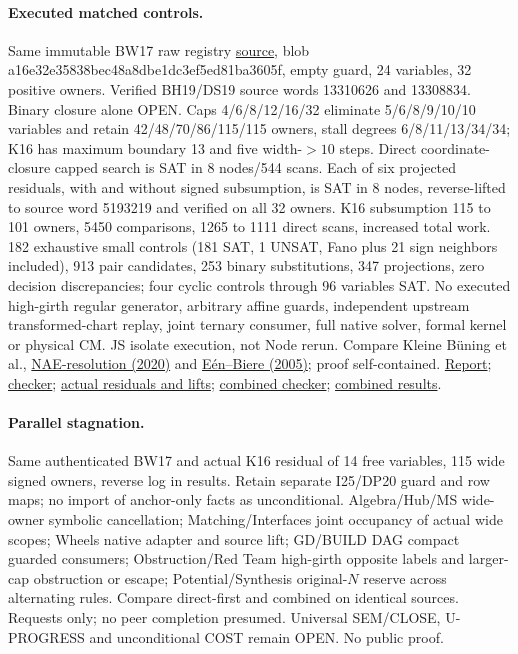 \documentclass[11pt]{article}
\begin{document}
\paragraph{Executed matched controls.}
Same immutable BW17 raw registry \href{https://github.com/j15marti/pnp/commit/9164cb11c6fcdf96d470de9d86b061e3201a591f}{source}, blob a16e32e35838bec48a8dbe1dc3ef5ed81ba3605f, empty guard, 24 variables, 32 positive owners. Verified BH19/DS19 source words 13310626 and 13308834. Binary closure alone OPEN. Caps 4/6/8/12/16/32 eliminate 5/6/8/9/10/10 variables and retain 42/48/70/86/115/115 owners, stall degrees 6/8/11/13/34/34; K16 has maximum boundary 13 and five width-$>10$ steps. Direct coordinate-closure capped search is SAT in 8 nodes/544 scans. Each of six projected residuals, with and without signed subsumption, is SAT in 8 nodes, reverse-lifted to source word 5193219 and verified on all 32 owners. K16 subsumption 115 to 101 owners, 5450 comparisons, 1265 to 1111 direct scans, increased total work. 182 exhaustive small controls (181 SAT, 1 UNSAT, Fano plus 21 sign neighbors included), 913 pair candidates, 253 binary substitutions, 347 projections, zero decision discrepancies; four cyclic controls through 96 variables SAT. No executed high-girth regular generator, arbitrary affine guards, independent upstream transformed-chart replay, joint ternary consumer, full native solver, formal kernel or physical CM. JS isolate execution, not Node rerun. Compare Kleine B\"uning et al., \href{https://www.cambridge.org/core/journals/mathematical-structures-in-computer-science/article/abs/naeresolution-a-new-resolution-refutation-technique-to-prove-notallequal-unsatisfiability/71BA5694413B2792934E719E92423263}{NAE-resolution (2020)} and \href{https://research.chalmers.se/en/publication/115015}{E\'en--Biere (2005)}; proof self-contained. \href{https://github.com/j15marti/pnp/commit/2b2ab07b53119a46da3f1ffae317c417e3f96242}{Report}; \href{https://github.com/j15marti/pnp/commit/fe41f30946314fd8f060c4a48f646ad45aa01a51}{checker}; \href{https://github.com/j15marti/pnp/commit/ff92a1c3d44e4b48dc9a7bf215825075396cae5a}{actual residuals and lifts}; \href{https://github.com/j15marti/pnp/commit/185dfd4736f5608a8e21cae345146070ab215c2b}{combined checker}; \href{https://github.com/j15marti/pnp/commit/5e0b2a491c445644a2e1d206f393405fb9c6e8ef}{combined results}.
\paragraph{Parallel stagnation.}
Same authenticated BW17 and actual K16 residual of 14 free variables, 115 wide signed owners, reverse log in results. Retain separate I25/DP20 guard and row maps; no import of anchor-only facts as unconditional. Algebra/Hub/MS wide-owner symbolic cancellation; Matching/Interfaces joint occupancy of actual wide scopes; Wheels native adapter and source lift; GD/BUILD DAG compact guarded consumers; Obstruction/Red Team high-girth opposite labels and larger-cap obstruction or escape; Potential/Synthesis original-$N$ reserve across alternating rules. Compare direct-first and combined on identical sources. Requests only; no peer completion presumed. Universal SEM/CLOSE, U-PROGRESS and unconditional COST remain OPEN. No public proof.
\end{document}
